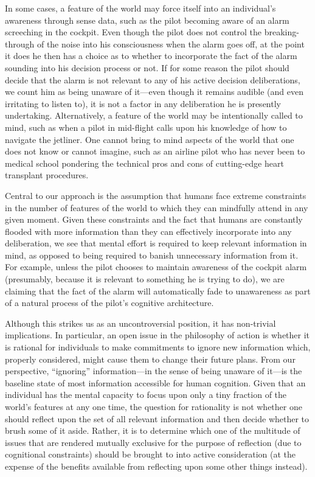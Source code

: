 \documentclass[
11pt,
titlepage,
reqno,
]{article}%
\theoremstyle{definition}
\begin{document}
In some cases, a feature of the world may force itself into an individual's awareness through sense data, such as the pilot becoming aware of an alarm screeching in the cockpit.
Even though the pilot does not control the breaking-through of the noise into his consciousness when the alarm goes off, at the point it does he then has a choice as to whether to incorporate the fact of the alarm sounding into his decision process or not.
If for some reason the pilot should decide that the alarm is not relevant to any of his active decision deliberations, we count him as being unaware of it---even though it remains audible (and even irritating to listen to), it is not a factor in any deliberation he is presently undertaking.
Alternatively, a feature of the world may be intentionally called to mind, such as when a pilot in mid-flight calls upon his knowledge of how to navigate the jetliner. 
One cannot bring to mind aspects of the world that one does not know or cannot imagine, such as an airline pilot who has never been to medical school pondering the technical pros and cons of cutting-edge heart transplant procedures. 

Central to our approach is the assumption that humans face extreme constraints in the number of features of the world to which they can mindfully attend in any given moment.
Given these constraints and the fact that humans are constantly flooded with more information than they can effectively incorporate into any deliberation, we see that mental effort is required to keep relevant information in mind, as opposed to being required to banish unnecessary information from it.
For example, unless the pilot chooses to maintain awareness of the cockpit alarm (presumably, because it is relevant to something he is trying to do), we are claiming that the fact of the alarm will automatically fade to unawareness as part of a natural process of the pilot's  cognitive architecture. 

Although this strikes us as an uncontroversial position, it has non-trivial implications.
In particular, an open issue in the philosophy of action is whether it is rational for individuals to make commitments to ignore new information which, properly considered, might cause them to change their future plans.
From our perspective, ``ignoring'' information---in the sense of being unaware of it---is the baseline state of most information accessible for human cognition.
Given that an individual has the mental capacity to focus upon only a tiny fraction of the world's features at any one time, the question for rationality is not whether one should reflect upon the set of all relevant information and then decide whether to brush some of it aside.
Rather, it is to determine which one of the multitude of issues that are rendered mutually exclusive for the purpose of reflection (due to cognitional constraints) should be brought to into active consideration (at the expense of the benefits available from reflecting upon some other things instead).
\end{document}
